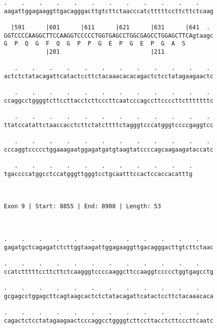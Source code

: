 \documentclass{article}
\begin{document}
\begin{Verbatim}
.    .    .    .    .    .    .    .    .    .    .    .    
aagattggagaaggttgacagggacttgtcttctaacccatctttttccttcttctcaag
                                                            
  |591      |601      |611      |621      |631      |641  . 
GGTCCCCAAGGCTTCCAAGGTCCCCCTGGTGAGCCTGGCGAGCCTGGAGCTTCAgtaagc
G  P  Q  G  F  Q  G  P  P  G  E  P  G  E  P  G  A  S        
            |201                          |211              
  
   .    .    .    .    .    .    .    .    .    .    .    . 
actctctatacagattcatactccttctacaaacacacagactctcctatagaagaactc
                                                            
   .    .    .    .    .    .    .    .    .    .    .    . 
ccaggcctggggtcttccttacctcttcccttcaatcccagccttccccttctttttttc
                                                            
   .    .    .    .    .    .    .    .    .    .    .    . 
ttatccatattctaaccacctcttctatcttttctagggtcccatgggtccccgaggtcc
                                                            
   .    .    .    .    .    .    .    .    .    .    .    . 
cccaggtccccctggaaagaatggagatgatgtaagtatccccagcaagaagataccatc
                                                            
   .    .    .    .    .    .    .    .    .    .    .
tgaccccatggcctccatgggttgggtcctgcaatttccactccaccacatttg
                                                      
                                                      
 
Exon 9 | Start: 8855 | End: 8908 | Length: 53



.    .    .    .    .    .    .    .    .    .    .    .    
gagatgctcagagatctcttggtaagattggagaaggttgacagggacttgtcttctaac
                                                            
.    .    .    .    .    .    .    .    .    .    .    .    
ccatctttttccttcttctcaagggtccccaaggcttccaaggtccccctggtgagcctg
                                                            
.    .    .    .    .    .    .    .    .    .    .    .    
gcgagcctggagcttcagtaagcactctctatacagattcatactccttctacaaacaca
                                                            
.    .    .    .    .    .    .    .    .    .    .    .    
cagactctcctatagaagaactcccaggcctggggtcttccttacctcttcccttcaatc
                                                            

\end{Verbatim}
\end{document}
